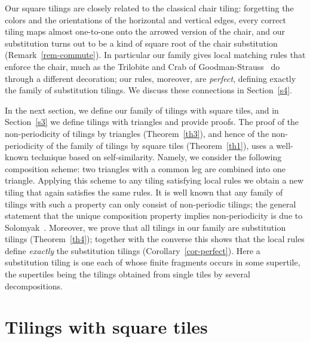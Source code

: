 \documentclass[11pt]{article}
\theoremstyle{remark}
\begin{document}
Our square tilings are closely related to the classical chair tiling: forgetting
the colors and the orientations of the horizontal and vertical edges, every
correct tiling maps almost one-to-one onto the arrowed version of the chair, and
our substitution turns out to be a kind of square root of the chair substitution
(Remark~\ref{rem-commute}). In particular our family gives local matching rules that
enforce the chair, much as the Trilobite and Crab of Goodman-Strauss~\cite{gscrab}
do through a different decoration; our rules, moreover, are \emph{perfect}, defining
exactly the family of substitution tilings. We discuss these connections in
Section~\ref{s4}.

In the next section, we define our family of tilings with square tiles, and in 
Section~\ref{s3} we define tilings with triangles and provide proofs. 
The proof of the non-periodicity of tilings by triangles (Theorem~\ref{th3}), 
and hence of the non-periodicity of the family of tilings by square tiles (Theorem~\ref{th1}), 
uses a well-known technique based on self-similarity. 
Namely, we consider the following composition scheme: 
two triangles with a common leg are combined into one triangle. 
Applying this scheme to any tiling satisfying local rules we obtain a new tiling that again satisfies the same rules. 
It is well known that any family of tilings with such a property can only consist of non-periodic tilings; the general statement that the unique composition property implies non-periodicity is due to Solomyak~\cite{solomyak}.
Moreover, we prove that all tilings in our family are substitution tilings (Theorem~\ref{th4});
together with the converse this shows that the local rules define \emph{exactly} the substitution
tilings (Corollary~\ref{cor-perfect}). Here a substitution tiling is one each of whose finite
fragments occurs in some supertile, the supertiles being the tilings obtained from single tiles
by several decompositions.

\section{Tilings with square tiles} \label{s2}
\end{document}

